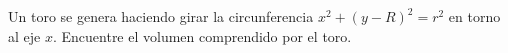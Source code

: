 \item Un toro se genera haciendo girar la circunferencia $x^2 + (y - R)^2 = r^2$ en torno al eje $x$. Encuentre el volumen comprendido por el toro.

